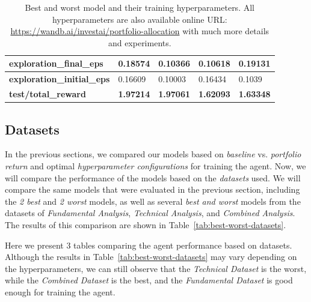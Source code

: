 \documentclass[../xlapes02]{subfiles}
\begin{document}
\begin{table}[!ht]
{\begin{tabular}{|l||l|l||l|l|}
                \textbf{exploration\_final\_eps}   & 0.18574                                      & 0.10366                                      & 0.10618                                      & 0.19131                                      \\ \hline
                \textbf{exploration\_initial\_eps} & 0.16609                                      & 0.10003                                      & 0.16434                                      & 0.1039                                       \\ \hline
                \textbf{test/total\_reward}        & \textcolor[RGB]{50,150,50}{\textbf{1.97214}} & \textcolor[RGB]{50,150,50}{\textbf{1.97061}} & \textcolor[RGB]{150,50,50}{\textbf{1.62093}} & \textcolor[RGB]{150,50,50}{\textbf{1.63348}} \\ \hline
            \end{tabular}
        }
        \caption{Best and worst model and their training hyperparameters. All hyperparameters are also available online URL: \url{https://wandb.ai/investai/portfolio-allocation} with much more details and experiments.}
        \label{tab:best-worst-hyperparameters}
    \end{table}

    \subsection{Datasets}\label{subsec:datasets}
    In the previous sections, we compared our models based on \emph{baseline} vs. \emph{portfolio return} and optimal \emph{hyperparameter configurations} for training the agent. Now, we will compare the performance of the models based on the \emph{datasets} used. We will compare the same models that were evaluated in the previous section, including the \emph{2 best} and \emph{2 worst} models, as well as several \emph{best and worst} models from the datasets of \emph{Fundamental Analysis}, \emph{Technical Analysis}, and \emph{Combined Analysis}. The results of this comparison are shown in Table~\cref{tab:best-worst-datasets}.

    Here we present 3 tables comparing the agent performance based on datasets. Although the results in Table~\cref{tab:best-worst-datasets} may vary depending on the hyperparameters, we can still observe that the \emph{Technical Dataset} is the worst, while the \emph{Combined Dataset} is the best, and the \emph{Fundamental Dataset} is good enough for training the agent.
\end{document}
